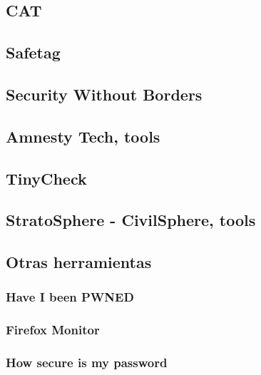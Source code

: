 \documentclass[12pt]{caltech_thesis}
\begin{document}
\lipsum[1]

\subsection{CAT}

\lipsum[1]


\subsection{Safetag}

\lipsum[1]

\subsection{Security Without Borders}

\lipsum[1]

\subsection{Amnesty Tech, tools}

\lipsum[1]

\subsection{TinyCheck}

\lipsum[1]

\subsection{StratoSphere - CivilSphere, tools}

\lipsum[1]

\subsection{Otras herramientas}

\subsubsection{Have I been PWNED}

\subsubsection{Firefox Monitor}

\subsubsection{How secure is my password}
\end{document}
